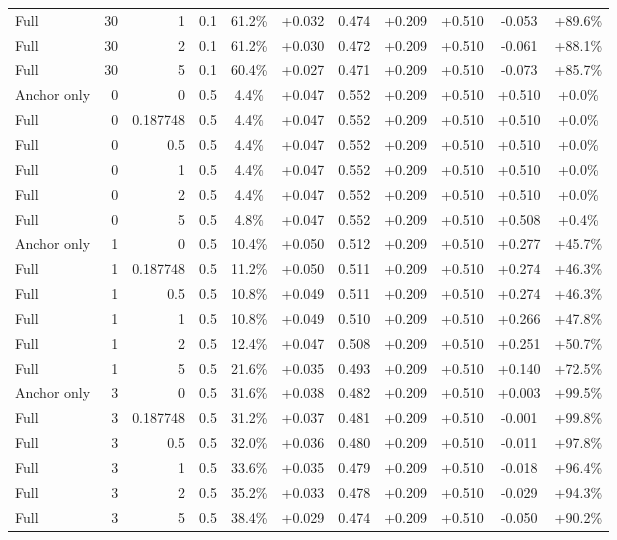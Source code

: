 \begin{table}[htbp]
\begin{tabular}{lrrrccccccc}
Full & 30 & 1 & 0.1 & 61.2\% & +0.032 & 0.474 & +0.209 & +0.510 & -0.053 & +89.6\% \\
Full & 30 & 2 & 0.1 & 61.2\% & +0.030 & 0.472 & +0.209 & +0.510 & -0.061 & +88.1\% \\
Full & 30 & 5 & 0.1 & 60.4\% & +0.027 & 0.471 & +0.209 & +0.510 & -0.073 & +85.7\% \\
Anchor only & 0 & 0 & 0.5 & 4.4\% & +0.047 & 0.552 & +0.209 & +0.510 & +0.510 & +0.0\% \\
Full & 0 & 0.187748 & 0.5 & 4.4\% & +0.047 & 0.552 & +0.209 & +0.510 & +0.510 & +0.0\% \\
Full & 0 & 0.5 & 0.5 & 4.4\% & +0.047 & 0.552 & +0.209 & +0.510 & +0.510 & +0.0\% \\
Full & 0 & 1 & 0.5 & 4.4\% & +0.047 & 0.552 & +0.209 & +0.510 & +0.510 & +0.0\% \\
Full & 0 & 2 & 0.5 & 4.4\% & +0.047 & 0.552 & +0.209 & +0.510 & +0.510 & +0.0\% \\
Full & 0 & 5 & 0.5 & 4.8\% & +0.047 & 0.552 & +0.209 & +0.510 & +0.508 & +0.4\% \\
Anchor only & 1 & 0 & 0.5 & 10.4\% & +0.050 & 0.512 & +0.209 & +0.510 & +0.277 & +45.7\% \\
Full & 1 & 0.187748 & 0.5 & 11.2\% & +0.050 & 0.511 & +0.209 & +0.510 & +0.274 & +46.3\% \\
Full & 1 & 0.5 & 0.5 & 10.8\% & +0.049 & 0.511 & +0.209 & +0.510 & +0.274 & +46.3\% \\
Full & 1 & 1 & 0.5 & 10.8\% & +0.049 & 0.510 & +0.209 & +0.510 & +0.266 & +47.8\% \\
Full & 1 & 2 & 0.5 & 12.4\% & +0.047 & 0.508 & +0.209 & +0.510 & +0.251 & +50.7\% \\
Full & 1 & 5 & 0.5 & 21.6\% & +0.035 & 0.493 & +0.209 & +0.510 & +0.140 & +72.5\% \\
Anchor only & 3 & 0 & 0.5 & 31.6\% & +0.038 & 0.482 & +0.209 & +0.510 & +0.003 & +99.5\% \\
Full & 3 & 0.187748 & 0.5 & 31.2\% & +0.037 & 0.481 & +0.209 & +0.510 & -0.001 & +99.8\% \\
Full & 3 & 0.5 & 0.5 & 32.0\% & +0.036 & 0.480 & +0.209 & +0.510 & -0.011 & +97.8\% \\
Full & 3 & 1 & 0.5 & 33.6\% & +0.035 & 0.479 & +0.209 & +0.510 & -0.018 & +96.4\% \\
Full & 3 & 2 & 0.5 & 35.2\% & +0.033 & 0.478 & +0.209 & +0.510 & -0.029 & +94.3\% \\
Full & 3 & 5 & 0.5 & 38.4\% & +0.029 & 0.474 & +0.209 & +0.510 & -0.050 & +90.2\% \\

\end{tabular}
\end{table}
